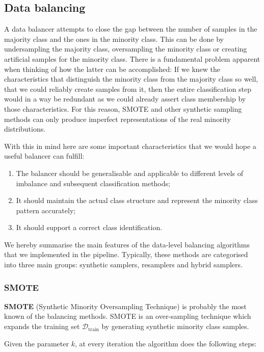 \subsection{Data balancing}

A data balancer attempts to close the gap between the number of samples in the majority class and the ones in the minority class.
This can be done by undersampling the majority class, oversampling the minority class or creating artificial samples for the minority class.
There is a fundamental problem apparent when thinking of how the latter can be accomplished:
If we knew the characteristics that distinguish the minority class from the majority class so well, that we could reliably create samples from it,
then the entire classification step would in a way be redundant as we could already assert class membership by those characteristics.
For this reason, SMOTE and other synthetic sampling methods can only produce imperfect representations of the real minority distributions.

With this in mind here are some important characteristics that we would hope a useful balancer can fulfill:
\begin{enumerate}[label=$\bullet$]
\item The balancer should be generalisable and applicable to different levels of imbalance and subsequent classification methods;
\item It should maintain the actual class structure and represent the minority class pattern accurately;
\item It should support a correct class identification.
\end{enumerate}
   
We hereby summarise the main features of the data-level balancing algorithms that we implemented in the pipeline. Typically, these methods are categorised into three main groups: synthetic samplers, resamplers and hybrid samplers.

\subsubsection{SMOTE}
\textbf{SMOTE} (Synthetic Minority Oversampling Technique) is probably the most known of the balancing methods. 
SMOTE is an over-sampling technique which expands the training set $\mathcal{D}_\text{train}$ by generating synthetic minority class samples.

Given the parameter $k$, at every iteration the algorithm does the following steps:


